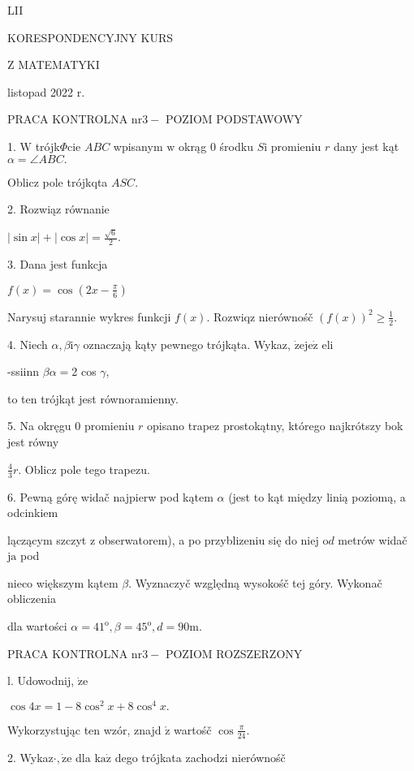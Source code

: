 \documentclass[a4paper,12pt]{article}
\begin{document}
LII

KORESPONDENCYJNY KURS

Z MATEMATYKI

listopad 2022 r.

PRACA KONTROLNA $\mathrm{n}\mathrm{r} 3-$ POZIOM PODSTAWOWY

1. $\mathrm{W}$ trójk$\Phi$cie $ABC$ wpisanym $\mathrm{w}$ okrąg $0$ środku $S\mathrm{i}$ promieniu $r$ dany jest kąt $\alpha=\angle ABC.$

Oblicz pole trójkqta $ASC.$

2. Rozwiąz równanie

$|\displaystyle \sin x|+|\cos x|=\frac{\sqrt{6}}{2}.$

3. Dana jest funkcja

$f(x)=\displaystyle \cos(2x-\frac{\pi}{6})$

Narysuj starannie wykres funkcji $f(x)$. Rozwiqz nierównośč $(f(x))^{2}\displaystyle \geq\frac{1}{2}.$

4. Niech $\alpha, \beta \mathrm{i}\gamma$ oznaczają kąty pewnego trójkąta. Wykaz, $\dot{\mathrm{z}}\mathrm{e}\mathrm{j}\mathrm{e}\dot{\mathrm{z}}$ eli

-ssiinn $\beta\alpha =$2 cos $\gamma$,

to ten trójkąt jest równoramienny.

5. Na okręgu $0$ promieniu $r$ opisano trapez prostokątny, którego najkrótszy bok jest równy

$\displaystyle \frac{4}{3}r$. Oblicz pole tego trapezu.

6. Pewną górę widač najpierw pod kątem $\alpha$ (jest to kąt między linią poziomą, a odcinkiem

lączącym szczyt $\mathrm{z}$ obserwatorem), a po przyblizeniu się do niej $\mathrm{o}d$ metrów widač $\mathrm{j}\mathrm{a}$ pod

nieco większym kątem $\beta$. Wyznaczyč względną wysokośč tej góry. Wykonač obliczenia

dla wartości $\alpha=41^{\mathrm{o}}, \beta=45^{\mathrm{o}}, d=90\mathrm{m}.$




PRACA KONTROLNA $\mathrm{n}\mathrm{r} 3-$ POZIOM ROZSZERZONY

l. Udowodnij, $\dot{\mathrm{z}}\mathrm{e}$

$\cos 4x=1-8\cos^{2}x+8\cos^{4}x.$

Wykorzystując ten wzór, znajd $\acute{\mathrm{z}}$ wartośč $\displaystyle \cos\frac{\pi}{24}.$

2. Wykaz$\cdot, \dot{\mathrm{z}}\mathrm{e}$ dla $\mathrm{k}\mathrm{a}\dot{\mathrm{z}}$ dego trójkata zachodzi nierównośč
\end{document}
